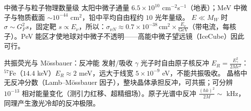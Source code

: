 \begin{结论}{中微子与粒子物理数量级}
太阳中微子通量 $6.5\times10^{10}$ cm$^{-2}$s$^{-1}$（地表）；MeV 中微子与物质截面 $\sim10^{-44}$ cm$^2$，铅中平均自由程约 $10$ 光年量级。
$E\ll M_W$ 时 $\sigma\sim G_F^2s$，固定靶 $s\propto E_\nu$，所以：$\sigma_{\nu N}\approx0.7\times10^{-38}\,\text{cm}^2\times\frac{E_\nu}{\text{GeV}}$（带电流，每核子）。PeV 能区才使地球对中微子不透明——高能中微子望远镜（IceCube）因此可行。
\end{结论}

\begin{结论}{共振荧光与 Mössbauer：反冲能}
发射/吸收 $\gamma$ 光子时自由原子核反冲 $E_R=\frac{E_\gamma^2}{2Mc^2}$：$^{57}$Fe（$14.4$ keV）$E_R\approx2$ meV，远大于线宽 $5\times10^{-9}$ eV，不能共振吸收。
晶格中无反冲分数（Lamb--Mössbauer 因子），整块晶体承担反冲，可共振；可分辨 $10^{-13}$ 相对能量变化（测引力红移、超精细场）。原子光谱中反冲 $\frac{(\hbar k)^2}{2M}\sim$ kHz，同理产生激光冷却的反冲极限。
\end{结论}

